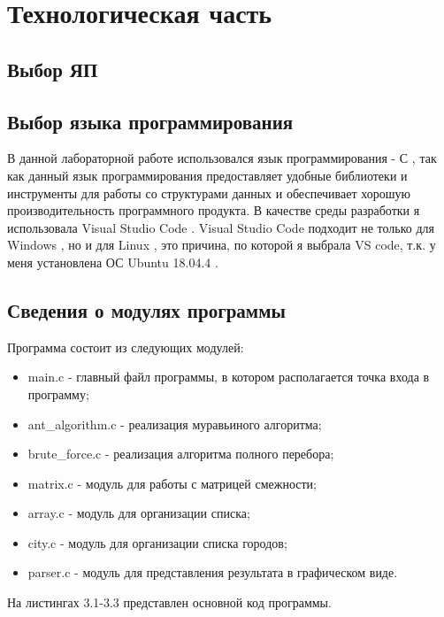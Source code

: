 \chapter{Технологическая часть}

\section{Выбор ЯП}

\section{Выбор языка программирования}
В данной лабораторной работе использовался язык программирования - С  \cite{Microsoft},
так как данный язык программирования предоставляет удобные библиотеки и инструменты для
работы со структурами данных и обеспечивает хорошую производительность программного продукта.
В качестве среды разработки я использовала Visual Studio Code \cite{Vs}.
Visual Studio Code подходит не только для  Windows \cite{Win},
но и для Linux \cite{Lin}, это причина,
по которой я выбрала VS code,
т.к. у меня установлена ОС Ubuntu 18.04.4 \cite{Ubuntu}.

\section{Сведения о модулях программы}

Программа состоит из следующих модулей:

\begin{itemize}
	\item main.c - главный файл программы, в котором располагается точка входа в программу;
	\item ant\_algorithm.c - реализация муравьиного алгоритма;
	\item brute\_force.c - реализация алгоритма полного перебора;
	\item matrix.c - модуль для работы с матрицей смежности;
	\item array.c - модуль для организации списка;
	\item city.c - модуль для организации списка городов;
	\item parser.c - модуль для представления результата в графическом виде.
\end{itemize}

На листингах 3.1-3.3 представлен основной код программы.


